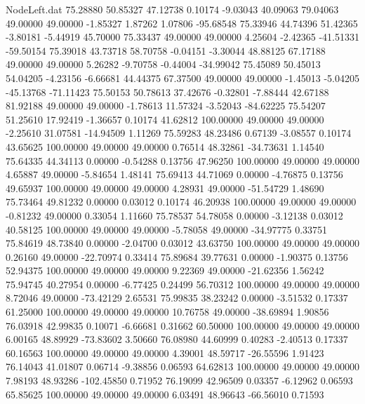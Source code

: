\begin{filecontents}{NodeLeft.dat}
  75.28880   50.85327   47.12738     0.10174   -9.03043   40.09063   79.04063   49.00000   49.00000   -1.85327    1.87262    1.07806  -95.68548
  75.33946   44.74396   51.42365    -3.80181   -5.44919   45.70000   75.33437   49.00000   49.00000    4.25604   -2.42365  -41.51331  -59.50154
  75.39018   43.73718   58.70758    -0.04151   -3.30044   48.88125   67.17188   49.00000   49.00000    5.26282   -9.70758   -0.44004  -34.99042
  75.45089   50.45013   54.04205    -4.23156   -6.66681   44.44375   67.37500   49.00000   49.00000   -1.45013   -5.04205  -45.13768  -71.11423
  75.50153   50.78613   37.42676    -0.32801   -7.88444   42.67188   81.92188   49.00000   49.00000   -1.78613   11.57324   -3.52043  -84.62225
  75.54207   51.25610   17.92419    -1.36657    0.10174   41.62812  100.00000   49.00000   49.00000   -2.25610   31.07581  -14.94509    1.11269
  75.59283   48.23486    0.67139    -3.08557    0.10174   43.65625  100.00000   49.00000   49.00000    0.76514   48.32861  -34.73631    1.14540
  75.64335   44.34113    0.00000    -0.54288    0.13756   47.96250  100.00000   49.00000   49.00000    4.65887   49.00000   -5.84654    1.48141
  75.69413   44.71069    0.00000    -4.76875    0.13756   49.65937  100.00000   49.00000   49.00000    4.28931   49.00000  -51.54729    1.48690
  75.73464   49.81232    0.00000     0.03012    0.10174   46.20938  100.00000   49.00000   49.00000   -0.81232   49.00000    0.33054    1.11660
  75.78537   54.78058    0.00000    -3.12138    0.03012   40.58125  100.00000   49.00000   49.00000   -5.78058   49.00000  -34.97775    0.33751
  75.84619   48.73840    0.00000    -2.04700    0.03012   43.63750  100.00000   49.00000   49.00000    0.26160   49.00000  -22.70974    0.33414
  75.89684   39.77631    0.00000    -1.90375    0.13756   52.94375  100.00000   49.00000   49.00000    9.22369   49.00000  -21.62356    1.56242
  75.94745   40.27954    0.00000    -6.77425    0.24499   56.70312  100.00000   49.00000   49.00000    8.72046   49.00000  -73.42129    2.65531
  75.99835   38.23242    0.00000    -3.51532    0.17337   61.25000  100.00000   49.00000   49.00000   10.76758   49.00000  -38.69894    1.90856
  76.03918   42.99835    0.10071    -6.66681    0.31662   60.50000  100.00000   49.00000   49.00000    6.00165   48.89929  -73.83602    3.50660
  76.08980   44.60999    0.40283    -2.40513    0.17337   60.16563  100.00000   49.00000   49.00000    4.39001   48.59717  -26.55596    1.91423
  76.14043   41.01807    0.06714    -9.38856    0.06593   64.62813  100.00000   49.00000   49.00000    7.98193   48.93286 -102.45850    0.71952
  76.19099   42.96509    0.03357    -6.12962    0.06593   65.85625  100.00000   49.00000   49.00000    6.03491   48.96643  -66.56010    0.71593

\end{filecontents}
